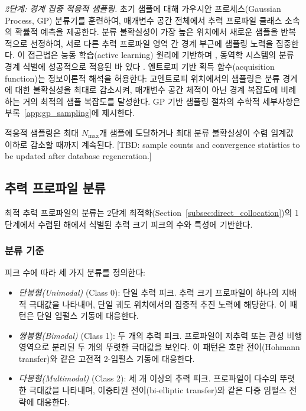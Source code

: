 \documentclass[a4paper,fleqn]{cas-dc}
\let\origsubsection\subsection
\renewcommand{\subsection}{\FloatBarrier\origsubsection}
\begin{document}
\textit{2단계: 경계 집중 적응적 샘플링.} 초기 샘플에 대해 가우시안 프로세스(Gaussian Process, GP) 분류기를 훈련하여, 매개변수 공간 전체에서 추력 프로파일 클래스 소속의 확률적 예측을 제공한다. 분류 불확실성이 가장 높은 위치에서 새로운 샘플을 반복적으로 선정하여, 서로 다른 추력 프로파일 영역 간 경계 부근에 샘플링 노력을 집중한다. 이 접근법은 능동 학습(active learning) 원리에 기반하며 \citep{Settles2009}, 동역학 시스템의 분류 경계 식별에 성공적으로 적용된 바 있다 \citep{Lee2023}. 엔트로피 기반 획득 함수(acquisition function)는 정보이론적 해석을 허용한다: 고엔트로피 위치에서의 샘플링은 분류 경계에 대한 불확실성을 최대로 감소시켜, 매개변수 공간 체적이 아닌 경계 복잡도에 비례하는 거의 최적의 샘플 복잡도를 달성한다. GP 기반 샘플링 절차의 수학적 세부사항은 부록~\ref{app:gp_sampling}에 제시한다.

적응적 샘플링은 최대 $N_{\text{max}}$개 샘플에 도달하거나 최대 분류 불확실성이 수렴 임계값 이하로 감소할 때까지 계속된다. [TBD: sample counts and convergence statistics to be updated after database regeneration.]

\subsection{추력 프로파일 분류}\label{subsec:classification}

최적 추력 프로파일의 분류는 2단계 최적화(Section~\ref{subsec:direct_collocation})의 1단계에서 수렴된 해에서 식별된 추력 크기 피크의 수와 특성에 기반한다.

\subsubsection{분류 기준}

피크 수에 따라 세 가지 분류를 정의한다:

\begin{itemize}
\item \textit{단봉형(Unimodal)} (Class 0): 단일 추력 피크. 추력 크기 프로파일이 하나의 지배적 극대값을 나타내며, 단일 궤도 위치에서의 집중적 추진 노력에 해당한다. 이 패턴은 단일 임펄스 기동에 대응한다.

\item \textit{쌍봉형(Bimodal)} (Class 1): 두 개의 추력 피크. 프로파일이 저추력 또는 관성 비행 영역으로 분리된 두 개의 뚜렷한 극대값을 보인다. 이 패턴은 호만 전이(Hohmann transfer)와 같은 고전적 2-임펄스 기동에 대응한다.

\item \textit{다봉형(Multimodal)} (Class 2): 세 개 이상의 추력 피크. 프로파일이 다수의 뚜렷한 극대값을 나타내며, 이중타원 전이(bi-elliptic transfer)와 같은 다중 임펄스 전략에 대응한다.
\end{itemize}
\end{document}
